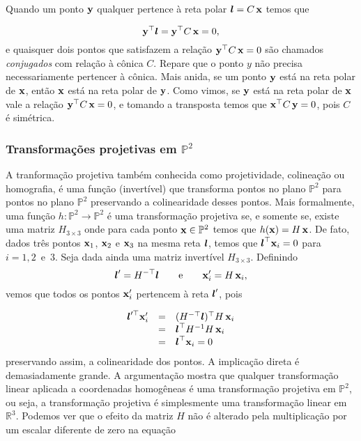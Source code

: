 
Quando um ponto ${\bf y}$ qualquer pertence à reta polar $\boldsymbol{l}=C\,\mathbf{x}$ temos que 

\begin{equation*}
{\bf y}^\top\boldsymbol{l}={\bf y}^\top C\,\mathbf{x}=0,
\end{equation*}
e quaisquer dois pontos que satisfazem a relação ${\bf y}^\top C\,\mathbf{x}=0$ são chamados \textit{conjugados} com relação à cônica $C$. Repare que o ponto $y$ não precisa necessariamente pertencer à cônica. Mais anida, se um ponto ${\bf y}$ está na reta polar de $\mathbf{x}$, então $\mathbf{x}$ está na reta polar de ${\bf y}$. Como vimos, se ${\bf y}$ está na reta polar de $\mathbf{x}$ vale a relação ${\bf y}^\top C\,\mathbf{x}=0$, e tomando a transposta temos que $\mathbf{x}^\top C\,{\bf y}=0$, pois $C$ é simétrica. 


\subsubsection{Transformações projetivas em $\mathbb{P}^2$}\label{sec.trans-proj-H}

A tranformação projetiva também conhecida como projetividade, colineação ou homografia,  é uma função (invertível) que transforma pontos no plano $\mathbb{P}^2$ para pontos no plano $\mathbb{P}^2$ preservando a colinearidade desses pontos. Mais formalmente, uma função $h:\mathbb{P}^2\rightarrow\mathbb{P}^2$ é uma transformação projetiva se, e somente se, existe uma matriz $H_{3\times3}$ onde para cada ponto $\mathbf{x}\in\mathbb{P}^2$ temos que $h(\mathbf{x})=H\,\mathbf{x}$. De fato, dados três pontos $\mathbf{x}_1$, $\mathbf{x}_2$ e $\mathbf{x}_3$ na mesma reta $\boldsymbol{l}$, temos que $\boldsymbol{l}^\top\mathbf{x}_i=0$ para $i=1,2 \,\,\,\text{e}\,\,\, 3$. Seja dada ainda uma matriz invertível $H_{3\times3}$. Definindo
\begin{equation*}
\boldsymbol{l}'=H^{-\top}\boldsymbol{l} \qquad\text{e}\qquad \mathbf{x}'_i=H\,\mathbf{x}_i,
\end{equation*}
vemos que todos os pontos $\mathbf{x}'_i$ pertencem à reta $\boldsymbol{l}'$, pois

\begin{equation*}
\begin{array}{rcl}
\boldsymbol{l}'^\top\mathbf{x}'_i&=&(H^{-\top}\boldsymbol{l})^\top H\,\mathbf{x}_i\\
&=&\boldsymbol{l}^\top H^{-1}H\,\mathbf{x}_i\\
&=&\boldsymbol{l}^\top\mathbf{x}_i=0
\end{array}
\end{equation*}
preservando assim, a colinearidade dos pontos. A implicação direta é demasiadamente grande. A argumentação mostra que qualquer transformação linear aplicada a coordenadas homogêneas é uma transformação projetiva em $\mathbb{P}^2$, ou seja, a transformação projetiva é simplesmente uma transformação linear em $\mathbb{R}^3$. Podemos ver que o efeito da matriz $H$ não é alterado pela multiplicação por um escalar diferente de zero na equação

